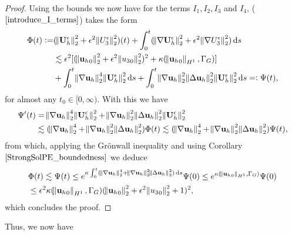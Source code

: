 \documentclass[11pt, a4paper]{article}
\newcommand*\diff{\mathop{}\!\mathrm{d}}
\begin{document}
\begin{proof}
Using the bounds we now have for the terms $I_1, I_2, I_3$ and $I_4$, ($\ref{introduce_I_terms}$) takes the form
\begin{equation}
\begin{split} \nonumber
\Phi (t):= & (\norm{\mathbf{U}_h^\epsilon}_2^2 + \epsilon^2 \norm{U_3^\epsilon}_2^2)(t) + \int_0^t (\norm{\nabla \mathbf{U}_h^\epsilon}_2^2 + \epsilon^2 \norm{\nabla U_3^\epsilon}_2^2) \diff s \\
& \lesssim \epsilon^2 [(\norm{{\mathbf{u}_h}_0}_2^2 + \epsilon^2 \norm{{u_3}_0}_2^2)^2 + \kappa (\norm{{\mathbf{u}_h}_0}_{H^1}, \Gamma_G)] \\
& + \int_0^{t} \norm{\nabla \mathbf{u}_h}_2^4 \norm{\mathbf{U}_h^\epsilon}_2^2 \diff s + \int_0^{t} \norm{\nabla \mathbf{u}_h}_2^2 \norm{\Delta \mathbf{u}_h}_2^2 \norm{\mathbf{U}_h^\epsilon}_2^2 \diff s =: \Psi(t),
\end{split}
\end{equation}
%
for almost any $t_0 \in [0, \infty).$ With this we have
\begin{equation}
\begin{split} \nonumber
\Psi'(t) & = \norm{\nabla \mathbf{u}_h}_2^4 \norm{\mathbf{U}_h^\epsilon}_2^2 + \norm{\nabla \mathbf{u}_h}_2^2 \norm{\Delta \mathbf{u}_h}_2^2 \norm{\mathbf{U}_h^\epsilon}_2^2 \\
& \lesssim (\norm{\nabla \mathbf{u}_h}_2^4 + \norm{\nabla \mathbf{u}_h}_2^2 \norm{\Delta \mathbf{u}_h}_2^2) \Phi (t) \lesssim (\norm{\nabla \mathbf{u}_h}_2^4 + \norm{\nabla \mathbf{u}_h}_2^2 \norm{\Delta \mathbf{u}_h}_2^2)\Psi(t),
\end{split}
\end{equation}
%
from which, applying the Gr\"onwall inequality and using Corollary $\ref{StrongSolPE_boundedness}$ we deduce
%
\begin{equation}
\begin{split} \nonumber
& \Phi (t) \lesssim \Psi (t) \leq e^{\kappa \int_0 ^ t (\norm{\nabla \mathbf{u}_h}_2^4 + \norm{\nabla \mathbf{u}_h}_2^2 \norm{\Delta \mathbf{u}_h}_2^2) \diff s} \Psi (0) \leq e^{\kappa(\norm{{\mathbf{u}_h}_0}_{H^1}, \Gamma_G)} \Psi(0) \\
& \leq \epsilon^2 \kappa (\norm{{\mathbf{u}_h}_0}_{H^1}, \Gamma_G) (\norm{{\mathbf{u}_h}_0}_2^2 + \epsilon^2 \norm{{u_3}_0}_2^2 + 1)^2,
\end{split}
\end{equation}
%
which concludes the proof.

\end{proof}
Thus, we now have
\end{document}
